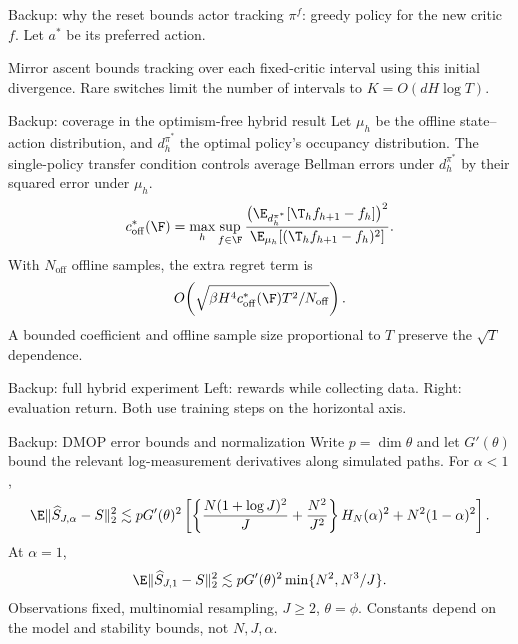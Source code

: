 \begin{frame}{Backup: why the reset bounds actor tracking}
$\pi^f$: greedy policy for the new critic $f$. Let $a^*$ be its preferred action.
\begin{center}\end{center}
\pause Mirror ascent bounds tracking over each fixed-critic interval using this initial divergence.
\gap Rare switches limit the number of intervals to $K=O(dH\log T)$.
\end{frame}

\begin{frame}{Backup: coverage in the optimism-free hybrid result}
Let $\mu_h$ be the offline state--action distribution, and $d_h^{\pi^*}$ the optimal policy's occupancy distribution.\gap
The single-policy transfer condition controls average Bellman errors under $d_h^{\pi^*}$ by their squared error under $\mu_h$.
\[
c_{\mathrm{off}}^*(\F)=
\max_h\sup_{f\in\F}
\frac{\bigl(\E_{d_h^{\pi^*}}[\T_h f_{h+1}-f_h]\bigr)^2}
{\E_{\mu_h}[(\T_h f_{h+1}-f_h)^2]}.
\]
With $N_{\mathrm{off}}$ offline samples, the extra regret term is
\[
O\!\left(\sqrt{\beta H^4 c_{\mathrm{off}}^*(\F)T^2/N_{\mathrm{off}}}\right).
\]
A bounded coefficient and offline sample size proportional to $T$ preserve the $\sqrt T$ dependence.
\end{frame}

\begin{frame}{Backup: full hybrid experiment}
\gap Left: rewards while collecting data. Right: evaluation return. Both use training steps on the horizontal axis.
\end{frame}

\begin{frame}{Backup: DMOP error bounds and normalization}
Write $p=\dim\theta$ and let $G'(\theta)$ bound the relevant log-measurement derivatives along simulated paths. For $\alpha<1$,
\[
\E\|\widehat S_{J,\alpha}-S\|_2^2\lesssim pG'(\theta)^2
\left[\left\{\frac{N(1+\log J)^2}{J}+\frac{N^2}{J^2}\right\}
H_N(\alpha)^2+N^2(1-\alpha)^2\right].
\]
At $\alpha=1$,
\[
\E\|\widehat S_{J,1}-S\|_2^2\lesssim pG'(\theta)^2\min\{N^2,N^3/J\}.
\]
Observations fixed, multinomial resampling, $J\geq2$, $\theta=\phi$. Constants depend on the model and stability bounds, not $N,J,\alpha$.
\end{frame}

